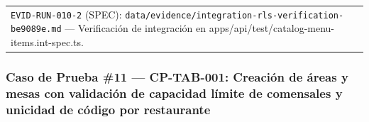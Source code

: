 \documentclass[10pt,a4paper]{article}
\begin{document}
{\begin{longtable}[]{@{}
  >{\raggedright\arraybackslash}p{}
  >{\raggedright\arraybackslash}p{}@{}}
\begin{minipage}[t]{\linewidth}
\texttt{EVID-{}\allowbreak{}RUN-{}\allowbreak{}010-{}\allowbreak{}2} (SPEC): \texttt{data/\allowbreak{}evidence/\allowbreak{}integration-{}\allowbreak{}rls-{}\allowbreak{}verification-{}\allowbreak{}be9089e.\allowbreak{}md} --- Verificación de integración en apps/api/test/catalog-menu-items.int-spec.ts.\strut
\end{minipage} \\
\end{longtable}
}

\endgroup\medskip


\subsubsection{Caso de Prueba \#11 --- CP-TAB-001: Creación de áreas y mesas con validación de capacidad límite de comensales y unicidad de código por restaurante}\label{caso-de-prueba-11--cp-tab-001-creaciuxf3n-de-uxe1reas-y-mesas-con-validaciuxf3n-de-capacidad-luxedmite-de-comensales-y-unicidad-de-cuxf3digo-por-restaurante}

\begingroup\singlespacing\footnotesize\setlength{\parskip}{0pt}
\end{document}
